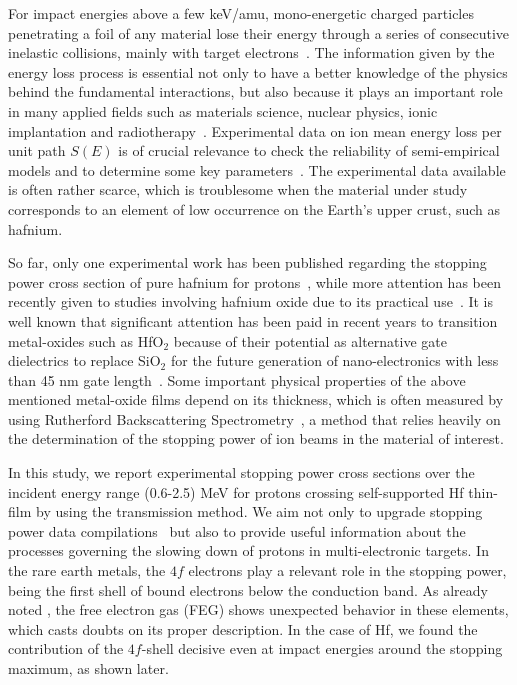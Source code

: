 \documentclass[aps,pra,reprint,groupedaddress,showpacs,showkeys]{revtex4-1}
\begin{document}
For impact energies above a few keV/amu, mono-energetic charged 
particles penetrating a foil of any material lose their energy through 
a series of consecutive inelastic collisions, mainly with target 
electrons~\cite{Chu01,Sigmund}. The information given by the energy 
loss process is essential not only to have a better knowledge of the 
physics behind the fundamental interactions, but also because it plays 
an important role in many applied fields such as materials science, 
nuclear physics, ionic implantation and radiotherapy~\cite{Sigmund,Schardt}. 
Experimental data on ion mean energy loss per unit path $S(E)$ is of 
crucial relevance to check the reliability of semi-empirical models and 
to determine some key parameters~\cite{Diwan,Damache04,Damache02}. The 
experimental data available is often rather scarce, which is troublesome 
when the material under study corresponds to an element of low 
occurrence on the Earth's upper crust, such as hafnium.

So far, only one experimental work has been published regarding the 
stopping power cross section of pure hafnium for protons~\cite{Sirotinin}, 
while more attention has been recently given to studies involving 
hafnium oxide due to its practical use~\cite{Abril,Behar,Primetzhofer,Roth}. 
It is well known that significant attention has been paid in recent 
years to transition metal-oxides such as HfO$_2$ because of their 
potential as alternative gate dielectrics to replace SiO$_2$ for the 
future generation of nano-electronics with less than 45 nm gate 
length~\cite{Choi,Robertson}. Some important physical properties of the 
above mentioned metal-oxide films depend on its thickness, which is 
often measured by using Rutherford Backscattering Spectrometry~\cite{Alfassi01,Tesmer01}, 
a method that relies heavily on the determination of the stopping power 
of ion beams in the material of interest.

In this study, we report experimental stopping power cross sections 
over the incident energy range (0.6-2.5) MeV for protons crossing 
self-supported Hf thin-film by using the transmission method. We aim 
not only to upgrade stopping power data compilations~\cite{HPaul03,mondim17} 
but also to provide useful information about the processes governing 
the slowing down of protons in multi-electronic targets. In the rare 
earth metals, the $4f$ electrons play a relevant role in the stopping 
power, being the first shell of bound electrons below the conduction 
band. As already noted \cite{Roth17}, the free electron gas (FEG) shows 
unexpected behavior in these elements, which casts doubts on its proper 
description. In the case of Hf, we found the contribution of the 
$4f$-shell decisive even at impact energies around the stopping maximum, 
as shown later.
\end{document}
